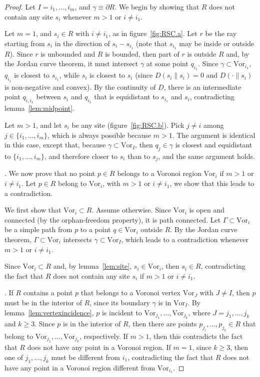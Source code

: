 \documentclass[11pt]{article}
\newcommand{\Vor}{\text{Vor}}
\newcommand{\D}[2]{D\left(#1 \parallel #2\right)}
\begin{document}
\begin{proof}
Let $I=i_1,\dots,i_m$, and $\gamma\equiv\partial R$. 
We begin by showing that $R$ does not contain any site $s_i$ whenever $m>1$ or $i\ne i_1$. 


Let $m=1$, and $s_i\in R$ with $i\ne i_1$, as in figure~\ref{fig:RSC.a}. 
Let $r$ be the ray starting from $s_i$ in the direction of $s_i-s_{i_1}$ 
	(note that $s_{i_1}$ may be inside or outside $R$). 
Since $r$ is unbounded and $R$ is bounded, then part of $r$ is outside $R$ and, 
	by the Jordan curve theorem, it must intersect $\gamma$ at some point $q_{i_1}$. 
Since $\gamma\subset\Vor_{i_1}$, 
	$q_{i_1}$ is closest to $s_{i_1}$, while $s_i$ is closest to $s_i$
		(since $\D{s_i}{s_i}=0$ and $\D{\cdot}{s_i}$ is non-negative and convex). 
By the continuity of $D$, there is an intermediate point $q_{i,i_1}$ between $s_i$ and $q_{i_1}$ 
	that is equidistant to $s_{i_1}$ and $s_i$, contradicting lemma~\ref{lem:midpoint}. 

Let $m>1$, and let $s_i$ be any site (figure~\ref{fig:RSC.b}). 
Pick $j\ne i$ among $j\in\{i_1,\dots,i_m\}$, 
	which is always possible because $m>1$. 
The argument is identical in this case, except that, 
	because $\gamma\subset\Vor_I$, then $q_j\in\gamma$ is closest and equidistant to $\{i_1,\dots,i_m\}$, 
	and therefore closer to $s_i$ than to $s_j$, and the same argument holds. 

\vspace*{0.05in}.
We now prove that no point $p\in R$ belongs to a Voronoi region $\Vor_i$ if $m>1$ or $i\ne i_1$. 
Let $p\in R$ belong to $\Vor_i$, with $m>1$ or $i\ne i_1$, we show that this leads to a contradiction. 

We first show that $\Vor_i\subset R$. 
Assume otherwise. Since $\Vor_i$ is open and connected (by the orphan-freedom property), it is path connected. 
Let $\Gamma\subset\Vor_i$ be a simple path from $p$ to a point $q\in\Vor_i$ outside $R$. 
By the Jordan curve theorem, $\Gamma\subset\Vor_i$ intersects $\gamma\subset\Vor_I$, 
	which leads to a contradiction whenever $m>1$ or $i\ne i_1$. 

Since $\Vor_i\subset R$ and, 
	by lemma~\ref{lem:site}, 
	$s_i\in\Vor_i$, then $s_i\in R$, contradicting the fact that $R$ does not contain any site $s_i$ if $m>1$ or $i\ne i_1$. 

\vspace*{0.05in}.
If $R$ contains a point $p$ that belongs to a Voronoi vertex $\Vor_J$ with $J\ne I$, 
	then $p$ must be in the interior of $R$, since its boundary $\gamma$ is in $\Vor_I$. 
By lemma~\ref{lem:vertexincidence}, $p$ is incident to $\Vor_{j_1},\dots,\Vor_{j_k}$, 
	where $J=j_1,\dots,j_k$ and $k\ge 3$. 
Since $p$ is in the interior of $R$, then there are points 
	$p_{j_i},\dots,p_{j_k}\in R$ that belong to $\Vor_{j_1},\dots,\Vor_{j_k}$, respectively. 
If $m>1$, then this contradicts the fact that $R$ does not have any point in a Voronoi region. 
If $m=1$, since $k\ge 3$, then one of $j_1,\dots,j_k$ must be different from $i_1$, 
	contradicting the fact that $R$ does not have any point in a Voronoi region different from $\Vor_{i_1}$. 


\end{proof}
\end{document}
